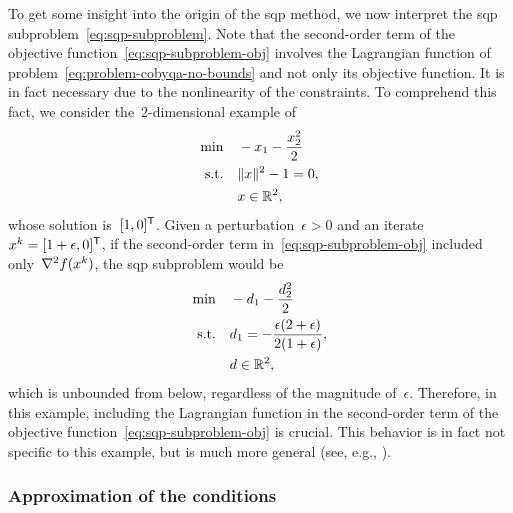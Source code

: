 To get some insight into the origin of the \gls{sqp} method, we now interpret the \gls{sqp} subproblem~\cref{eq:sqp-subproblem}.
Note that the second-order term of the objective function~\cref{eq:sqp-subproblem-obj} involves the Lagrangian function of problem~\cref{eq:problem-cobyqa-no-bounds} and not only its objective function.
It is in fact necessary due to the nonlinearity of the constraints.
To comprehend this fact, we consider the~$2$-dimensional example of \citeauthor{Boggs_Tolle_1995}~\cite{Boggs_Tolle_1995}
\begin{align*}
    \min        & \quad -x_1 - \frac{x_2^2}{2}\\
    \text{s.t.} & \quad \lVert x\rVert^2 - 1 = 0,\\
                & \quad x \in \mathbb{R}^2,
\end{align*}
whose solution is~$[1, 0]^{\mathsf{T}}$.
Given a perturbation~$\epsilon > 0$ and an iterate~$x^k = [1 + \epsilon, 0]^{\mathsf{T}}$, if the second-order term in~\cref{eq:sqp-subproblem-obj} included only~$\nabla^2 f(x^k)$, the \gls{sqp} subproblem would be
\begin{align*}
    \min        & \quad -d_1 - \frac{d_2^2}{2}\\
    \text{s.t.} & \quad d_1 = -\frac{\epsilon (2 + \epsilon)}{2 (1 + \epsilon)},\\
                & \quad d \in \mathbb{R}^2,
\end{align*}
which is unbounded from below, regardless of the magnitude of~$\epsilon$.
Therefore, in this example, including the Lagrangian function in the second-order term of the objective function~\cref{eq:sqp-subproblem-obj} is crucial.
This behavior is in fact not specific to this example, but is much more general (see, e.g., \cite[ch.~18]{Nocedal_Wright_2006}).

\subsubsection{Approximation of the  conditions}

